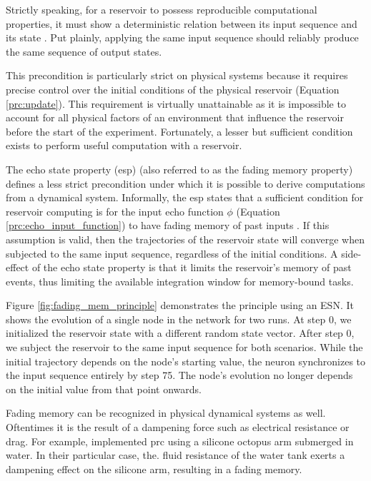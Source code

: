 
Strictly speaking, for a reservoir to possess reproducible computational properties, it must show a deterministic relation between its input sequence and its state \citep{nakajima_physical_2020}. 
Put plainly, applying the same input sequence should reliably produce the same sequence of output states.


This precondition is particularly strict on physical systems because it requires precise control over the initial conditions of the physical reservoir (Equation \ref{prc:update}).
This requirement is virtually unattainable as it is impossible to account for all physical factors of an environment that influence the reservoir before the start of the experiment.
Fortunately, a lesser but sufficient condition exists to perform useful computation with a reservoir.


The echo state property (\acrshort{esp}) (also referred to as the fading memory property) defines a less strict precondition under which it is possible to derive computations from a dynamical system.
Informally, the \acrshort{esp} states that a sufficient condition for reservoir computing is for the input echo function $\phi$ (Equation \ref{prc:echo_input_function}) to have fading memory of past inputs \citep{lukosevicius_reservoir_2012}. 
If this assumption is valid, then the trajectories of the reservoir state will converge when subjected to the same input sequence, regardless of the initial conditions.
A side-effect of the echo state property is that it limits the reservoir's memory of past events, thus limiting the available integration window for memory-bound tasks.


Figure \ref{fig:fading_mem_principle} demonstrates the principle using an ESN. It shows the evolution of a single node in the network for two runs. 
At step 0, we initialized the reservoir state with a different random state vector. 
After step 0, we subject the reservoir to the same input sequence for both scenarios.
While the initial trajectory depends on the node's starting value, the neuron synchronizes to the input sequence entirely by step 75. 
The node's evolution no longer depends on the initial value from that point onwards.



Fading memory can be recognized in physical dynamical systems as well.
Oftentimes it is the result of a dampening force such as electrical resistance or drag.
For example, \citet{nakajima_information_2015} implemented \acrshort{prc} using a silicone octopus arm submerged in water. 
In their particular case, the. fluid resistance of the water tank exerts a dampening effect on the silicone arm, resulting in a fading memory.


